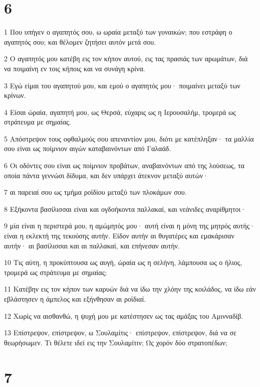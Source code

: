 \chapter{6}

\par 1 Που υπήγεν ο αγαπητός σου, ω ωραία μεταξύ των γυναικών; που εστράφη ο αγαπητός σου; και θέλομεν ζητήσει αυτόν μετά σου.
\par 2 Ο αγαπητός μου κατέβη εις τον κήπον αυτού, εις τας πρασιάς των αρωμάτων, διά να ποιμαίνη εν τοις κήποις και να συνάγη κρίνα.
\par 3 Εγώ είμαι του αγαπητού μου, και εμού ο αγαπητός μου· ποιμαίνει μεταξύ των κρίνων.
\par 4 Είσαι ώραία, αγαπητή μου, ως Θερσά, εύχαρις ως η Ιερουσαλήμ, τρομερά ως στράτευμα με σημαίας.
\par 5 Απόστρεψον τους οφθαλμούς σου απεναντίον μου, διότι με κατέπληξαν· τα μαλλία σου είναι ως ποίμνιον αιγών καταβαινόντων από Γαλαάδ.
\par 6 Οι οδόντες σου είναι ως ποίμνιον προβάτων, αναβαινόντων από της λούσεως, τα οποία πάντα γεννώσι δίδυμα, και δεν υπάρχει άτεκνον μεταξύ αυτών·
\par 7 αι παρειαί σου ως τμήμα ροϊδίου μεταξύ των πλοκάμων σου.
\par 8 Εξήκοντα βασίλισσαι είναι και ογδοήκοντα παλλακαί, και νεάνιδες αναρίθμητοι·
\par 9 μία είναι η περιστερά μου, η αμώμητός μου· αυτή είναι η μόνη της μητρός αυτής· είναι η εκλεκτή της τεκούσης αυτήν. Είδον αυτήν αι θυγατέρες και εμακάρισαν αυτήν· αι βασίλισσαι και αι παλλακαί, και επήνεσαν αυτήν.
\par 10 Τις αύτη, η προκύπτουσα ως αυγή, ώραία ως η σελήνη, λάμπουσα ως ο ήλιος, τρομερά ως στράτευμα με σημαίας;
\par 11 Κατέβην εις τον κήπον των καρυών διά να ίδω την χλόην της κοιλάδος, να ίδω εάν εβλάστησεν η άμπελος και εξήνθησαν αι ροϊδιαί.
\par 12 Χωρίς να αισθανθώ, η ψυχή μου με κατέστησεν ως τας αμάξας του Αμινναδίβ.
\par 13 Επίστρεψον, επίστρεψον, ω Σουλαμίτις· επίστρεψον, επίστρεψον, διά να σε θεωρήσωμεν. Τι θέλετε ιδεί εις την Σουλαμίτιν; Ως χορόν δύο στρατοπέδων;

\chapter{7}

